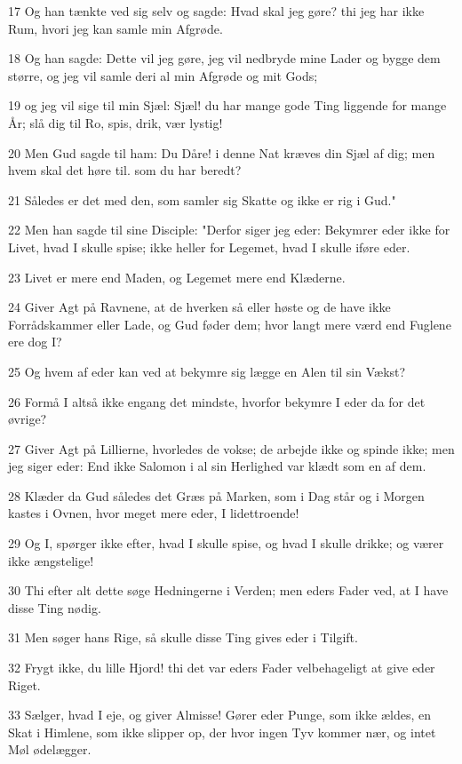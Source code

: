 \par 17 Og han tænkte ved sig selv og sagde: Hvad skal jeg gøre? thi jeg har ikke Rum, hvori jeg kan samle min Afgrøde.
\par 18 Og han sagde: Dette vil jeg gøre, jeg vil nedbryde mine Lader og bygge dem større, og jeg vil samle deri al min Afgrøde og mit Gods;
\par 19 og jeg vil sige til min Sjæl: Sjæl! du har mange gode Ting liggende for mange År; slå dig til Ro, spis, drik, vær lystig!
\par 20 Men Gud sagde til ham: Du Dåre! i denne Nat kræves din Sjæl af dig; men hvem skal det høre til. som du har beredt?
\par 21 Således er det med den, som samler sig Skatte og ikke er rig i Gud."
\par 22 Men han sagde til sine Disciple: "Derfor siger jeg eder: Bekymrer eder ikke for Livet, hvad I skulle spise; ikke heller for Legemet, hvad I skulle iføre eder.
\par 23 Livet er mere end Maden, og Legemet mere end Klæderne.
\par 24 Giver Agt på Ravnene, at de hverken så eller høste og de have ikke Forrådskammer eller Lade, og Gud føder dem; hvor langt mere værd end Fuglene ere dog I?
\par 25 Og hvem af eder kan ved at bekymre sig lægge en Alen til sin Vækst?
\par 26 Formå I altså ikke engang det mindste, hvorfor bekymre I eder da for det øvrige?
\par 27 Giver Agt på Lillierne, hvorledes de vokse; de arbejde ikke og spinde ikke; men jeg siger eder: End ikke Salomon i al sin Herlighed var klædt som en af dem.
\par 28 Klæder da Gud således det Græs på Marken, som i Dag står og i Morgen kastes i Ovnen, hvor meget mere eder, I lidettroende!
\par 29 Og I, spørger ikke efter, hvad I skulle spise, og hvad I skulle drikke; og værer ikke ængstelige!
\par 30 Thi efter alt dette søge Hedningerne i Verden; men eders Fader ved, at I have disse Ting nødig.
\par 31 Men søger hans Rige, så skulle disse Ting gives eder i Tilgift.
\par 32 Frygt ikke, du lille Hjord! thi det var eders Fader velbehageligt at give eder Riget.
\par 33 Sælger, hvad I eje, og giver Almisse! Gører eder Punge, som ikke ældes, en Skat i Himlene, som ikke slipper op, der hvor ingen Tyv kommer nær, og intet Møl ødelægger.
